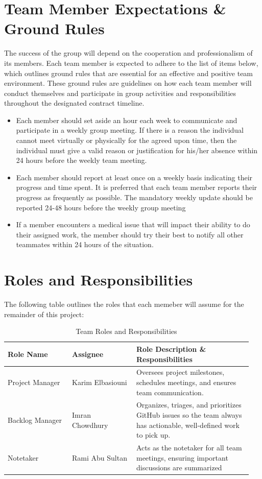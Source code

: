 \documentclass[12pt]{article}
\begin{document}
\section*{Team Member Expectations \& Ground Rules}
The success of the group will depend on the cooperation and professionalism of its members. Each team member is expected to adhere to the list of items below, which outlines ground rules that are essential for an 
effective and positive team environment. These ground rules are guidelines on how each team member will conduct themselves and participate in group activities and responsibilities throughout the designated contract timeline.  
\begin{itemize}
  \item Each member should set aside an hour each week to communicate and participate in a weekly group meeting. If there is a reason the individual cannot meet virtually or physically for the agreed upon time, then the individual must give a valid reason or justification for his/her absence within 24 hours before the weekly team meeting.
  \item Each member should report at least once on a weekly basis indicating their progress and time spent. It is preferred that each team member reports their progress as frequently as possible. The mandatory weekly update should be reported 24-48 hours before the weekly group meeting
  \item If a member encounters a medical issue that will impact their ability to do their assigned work, the member should try their best to notify all other teammates within 24 hours of the situation.
\end{itemize}


\section*{Roles and Responsibilities}
The following table outlines the roles that each memeber will assume for the remainder of this project:

\begin{table}[h]
  \centering
  \begin{tabular}{|p{0.25\linewidth}|p{0.25\linewidth}|p{0.45\linewidth}|}
    \hline
    \textbf{Role Name} & \textbf{Assignee} & \textbf{Role Description \& Responsibilities} \\
    \hline
    Project Manager & Karim Elbasiouni & Oversees project milestones, schedules meetings, and ensures team communication. \\
    \hline
    Backlog Manager & Imran Chowdhury &  Organizes, triages, and prioritizes GitHub issues so the team always has actionable, well-defined work to pick up. \\
    \hline
    Notetaker & Rami Abu Sultan & Acts as the notetaker for all team meetings, ensuring important discussions are summarized \\
    \hline
  \end{tabular}
  \caption{Team Roles and Responsibilities}
  \label{tab:roles}
\end{table}
\end{document}
